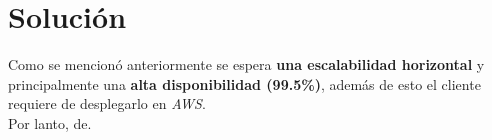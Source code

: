 \section{Solución}

Como se mencionó anteriormente se espera \textbf{una escalabilidad horizontal} y
principalmente una \textbf{alta disponibilidad (99.5\%)}, además de esto el
cliente requiere de desplegarlo en \textit{AWS}. \\

Por lanto, de.